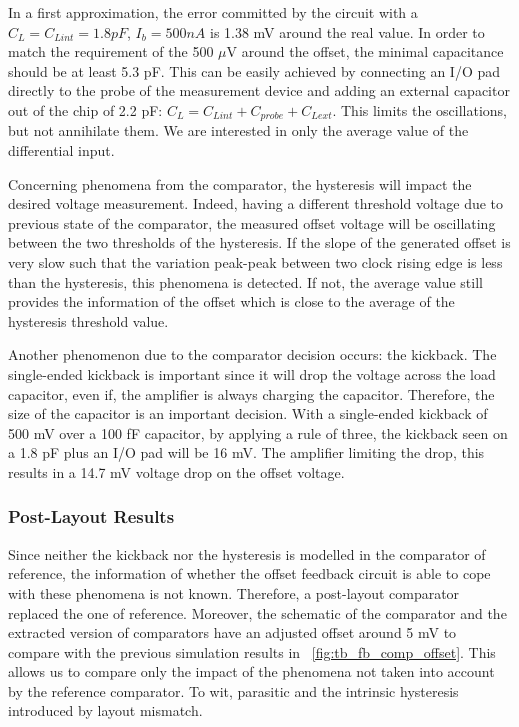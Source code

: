 In a first approximation, the error committed by the circuit with a $C_L = C_{Lint} = 1.8 pF$, $I_b = 500 nA$ is 1.38 mV around the real value. In order to match the requirement of the 500 $\mu$V around the offset, the minimal capacitance should be at least 5.3 pF. This can be easily achieved by connecting an I/O pad directly to the probe of the measurement device and adding an external capacitor out of the chip of 2.2 pF: $C_L = C_{Lint} + C_{probe} + C_{Lext}$. This limits the oscillations, but not annihilate them. We are interested in only the average value of the differential input.

Concerning phenomena from the comparator, the hysteresis will impact the desired voltage measurement. Indeed, having a different threshold voltage due to previous state of the comparator, the measured offset voltage will be oscillating between the two thresholds of the hysteresis.
If the slope of the generated offset is very slow such that the variation peak-peak between two clock rising edge is less than the hysteresis, this phenomena is detected. If not, the average value still provides the information of the offset which is close to the average of the hysteresis threshold value.

Another phenomenon due to the comparator decision occurs: the kickback. The single-ended kickback is important since it will drop the voltage across the load capacitor, even if, the amplifier is always charging the capacitor. Therefore, the size of the capacitor is an important decision.
With a single-ended kickback of 500 mV over a 100 fF capacitor, by applying a rule of three, the kickback seen on a 1.8 pF plus an I/O pad will be 16 mV. The amplifier limiting the drop, this results in a 14.7 mV voltage drop on the offset voltage.


\subsubsection{Post-Layout Results}
Since neither the kickback nor the hysteresis is modelled in the comparator of reference, the information of whether the offset feedback circuit is able to cope with these phenomena is not known. Therefore, a post-layout comparator replaced the one of reference. Moreover, the schematic of the comparator and the extracted version of comparators have an adjusted offset around 5 mV to compare with the previous simulation results in \figurename~\ref{fig:tb_fb_comp_offset}. This allows us to compare only the impact of the phenomena not taken into account by the reference comparator. To wit, parasitic and the intrinsic hysteresis introduced by layout mismatch.

